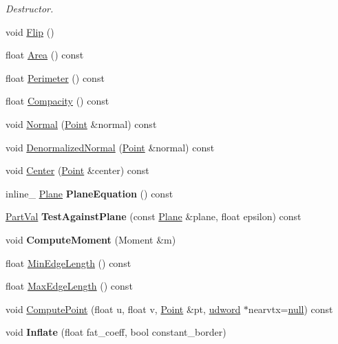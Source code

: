 \begin{DoxyCompactItemize}
\begin{DoxyCompactList}\small\item\em Destructor. \end{DoxyCompactList}\item 
void \hyperlink{class_triangle_a474ba7649c0a8fb7013892e7205911c9}{Flip} ()
\item 
float \hyperlink{class_triangle_ad3885c40e78c33327a622351dbb07ed7}{Area} () const 
\item 
float \hyperlink{class_triangle_a599d3355adcfa507458f8c59127162e7}{Perimeter} () const 
\item 
float \hyperlink{class_triangle_af797cac6e93b15df3ff798e66caaeca1}{Compacity} () const 
\item 
void \hyperlink{class_triangle_a5a58c9b3d52e65ba3c6bc45a01daa006}{Normal} (\hyperlink{class_point}{Point} \&normal) const 
\item 
void \hyperlink{class_triangle_ab3f35b42fe3eda2a5cb24ecb9352327a}{Denormalized\+Normal} (\hyperlink{class_point}{Point} \&normal) const 
\item 
void \hyperlink{class_triangle_ab12266ad0b45dfcdb90f73864324c610}{Center} (\hyperlink{class_point}{Point} \&center) const 
\item 
\hypertarget{class_triangle_a5fd363cf7a18893fd8e9a9725a51b6bf}{inline\+\_\+ \hyperlink{class_plane}{Plane} {\bfseries Plane\+Equation} () const }\label{class_triangle_a5fd363cf7a18893fd8e9a9725a51b6bf}

\item 
\hypertarget{class_triangle_a576c2439b17d2df127a309d455da88c2}{\hyperlink{_ice_triangle_8h_a996b8c795aeae8a7613008c9300751ea}{Part\+Val} {\bfseries Test\+Against\+Plane} (const \hyperlink{class_plane}{Plane} \&plane, float epsilon) const }\label{class_triangle_a576c2439b17d2df127a309d455da88c2}

\item 
\hypertarget{class_triangle_a0ff6ad4b924743fad9d16b7b29847d75}{void {\bfseries Compute\+Moment} (Moment \&m)}\label{class_triangle_a0ff6ad4b924743fad9d16b7b29847d75}

\item 
float \hyperlink{class_triangle_a013363d89cadfbaa44584c2d4514283a}{Min\+Edge\+Length} () const 
\item 
float \hyperlink{class_triangle_a7a67fed5c72f72dff4153d53cca3bf17}{Max\+Edge\+Length} () const 
\item 
void \hyperlink{class_triangle_ab7e8470714c153103ad1c1d72841e0cf}{Compute\+Point} (float u, float v, \hyperlink{class_point}{Point} \&pt, \hyperlink{_ice_types_8h_a44c6f1920ba5551225fb534f9d1a1733}{udword} $\ast$nearvtx=\hyperlink{_ice_types_8h_ac97b8ee753e4405397a42ad5799b0f9e}{null}) const 
\item 
\hypertarget{class_triangle_a707f856524937c61b1ada90faf19685c}{void {\bfseries Inflate} (float fat\+\_\+coeff, bool constant\+\_\+border)}\label{class_triangle_a707f856524937c61b1ada90faf19685c}

\end{DoxyCompactItemize}
